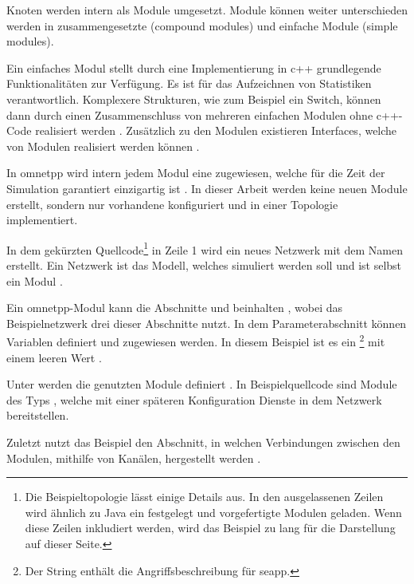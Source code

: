 Knoten werden intern als Module umgesetzt. Module können weiter unterschieden werden in zusammengesetzte (compound modules) und einfache Module (simple modules).

Ein einfaches Modul stellt durch eine Implementierung in \gls{c++} grundlegende Funktionalitäten zur Verfügung. Es ist für das Aufzeichnen von Statistiken verantwortlich. Komplexere Strukturen, wie zum Beispiel ein Switch, können dann durch einen Zusammenschluss von mehreren einfachen Modulen ohne \gls{c++}-Code realisiert werden \cite{OmnetBirdsEye2020}. Zusätzlich zu den Modulen existieren Interfaces, welche von Modulen realisiert werden können \cite[]{OmnetManual}. 

In \gls{omnetpp} wird intern jedem Modul eine  zugewiesen, welche für die Zeit der Simulation  garantiert einzigartig ist \cite[]{OmnetManual}. In dieser Arbeit werden keine neuen Module erstellt, sondern nur vorhandene konfiguriert und in einer Topologie implementiert.

In dem gekürzten Quellcode\footnote{Die Beispieltopologie lässt einige Details aus. In den ausgelassenen Zeilen wird ähnlich zu Java ein  festgelegt und vorgefertigte Modulen geladen. Wenn diese Zeilen inkludiert werden, wird das Beispiel zu lang für die Darstellung auf dieser Seite.} in Zeile 1 wird ein neues Netzwerk mit dem Namen  erstellt. Ein Netzwerk ist das Modell, welches simuliert werden soll und ist selbst ein Modul \cite[]{OmnetManual}.

Ein \gls{omnetpp}-Modul kann die Abschnitte  und  beinhalten \cite[]{OmnetManual}, wobei das Beispielnetzwerk drei dieser Abschnitte nutzt. In dem Parameterabschnitt können Variablen definiert und zugewiesen werden. In diesem Beispiel ist es ein \footnote{Der String  enthält die Angriffsbeschreibung für \gls{seapp}.} mit einem leeren Wert .

Unter  werden die genutzten Module definiert \cite[]{OmnetManual}. In Beispielquellcode sind \ua {} Module des Typs , welche mit einer späteren Konfiguration Dienste in dem Netzwerk bereitstellen.

Zuletzt nutzt das Beispiel den  Abschnitt, in welchen Verbindungen zwischen den Modulen, mithilfe von Kanälen, hergestellt werden \cite[]{OmnetManual}. 

